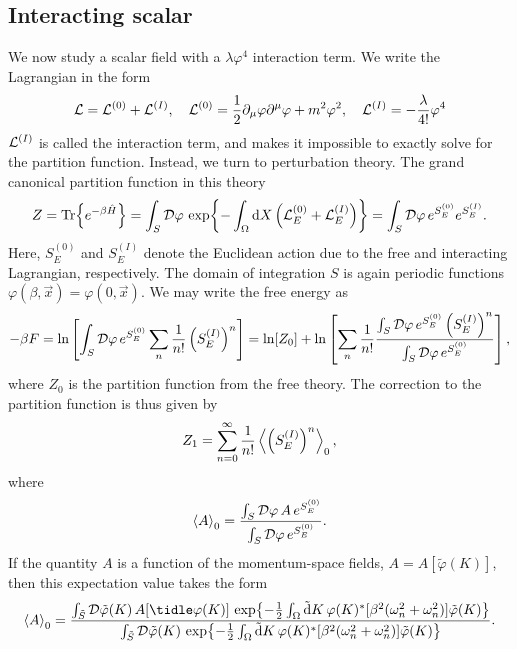 \subsection*{Interacting scalar}

We now study a scalar field with a $\lambda \varphi^4$ interaction term.
We write the Lagrangian in the form
\begin{equation*}
    \mathcal{L} = \mathcal{L}^{(0)} + \mathcal{L}^{(I)}, \quad 
    \mathcal{L}^{(0)} = 
    \frac{1}{2} \partial_\mu \varphi \partial^\mu \varphi  + m^2 \varphi^2 , \quad
    \mathcal{L}^{(I)} = - \frac{\lambda}{4!} \varphi^4
\end{equation*}
$\mathcal{L}^{(I)}$ is called the interaction term, and makes it impossible to exactly solve for the partition function.
Instead, we turn to perturbation theory.
The grand canonical partition function in this theory
\begin{equation}
    Z = \Tr{e^{- \beta \hat H}}
    = \int_S \mathcal{D} \varphi \, \exp{
        - \int_\Omega \dd X \left(\mathcal{L}_E^{(0)} + \mathcal{L}_E^{(I)}\right)
    }
    = \int_S \mathcal{D} \varphi \, e^{S^{(0)}_E} e^{S^{(I)}_E}.
\end{equation}
Here, $S_E^{(0)}$ and $S_E^{(I)}$ denote the Euclidean action due to the free and interacting Lagrangian, respectively.
The domain of integration $S$ is again periodic functions $\varphi(\beta, \vec x) = \varphi(0, \vec x)$.
We may write the free energy as
\begin{equation*}
    - \beta F = \ln
    \left[
        \int_S \mathcal{D} \varphi \, e^{S^{(0)}_E} \sum_n \frac{1}{n!}\left({S^{(I)}_E}\right)^n
    \right]
    = \ln[Z_0] 
    + \ln
    \left[
        \sum_n \frac{1}{n!}  
        \frac{
            \int_S \mathcal{D} \varphi \, e^{S^{(0)}_E} \left({S^{(I)}_E}\right)^n}
        {\int_S \mathcal{D} \varphi \, e^{S^{(0)}_E}}
    \right],
\end{equation*}
where $Z_0$ is the partition function from the free theory.
The correction to the partition function is thus given by
\begin{equation}
    Z_1 = \sum_{n=0}^\infty \frac{1}{n!} \ex{\left(S_E^{(I)}\right)^n}_0,
\end{equation}
where 
\begin{equation}
    \ex{A}_0 = \frac{
        \int_S \D \varphi \, A \, e^{S^{(0)}_E} }
    {\int_S \D \varphi \, e^{S^{(0)}_E}}.
\end{equation}
If the quantity $A$ is a function of the momentum-space fields, $A = A[\tilde \varphi(K)]$, then this expectation value takes the form
\begin{equation}
    \ex{A}_0 = 
    \frac{
        \int_{\tilde S} \D \tilde \varphi(K) \, A[\tidle\varphi(K)] \, 
        \exp{
            - \frac{1}{2} \int_\Omega 
            \tilde \dd K\, \varphi(K)^*[\beta^2(\omega_n^2 + \omega_n^2)]\tilde \varphi(K)
            }
        }
    {
        \int_{\tilde S} \D \tilde \varphi(K) \,
        \exp{
            - \frac{1}{2} \int_\Omega 
            \tilde \dd K\, \varphi(K)^*[\beta^2(\omega_n^2 + \omega_n^2)]\tilde \varphi(K)
            }
    }.
\end{equation}
